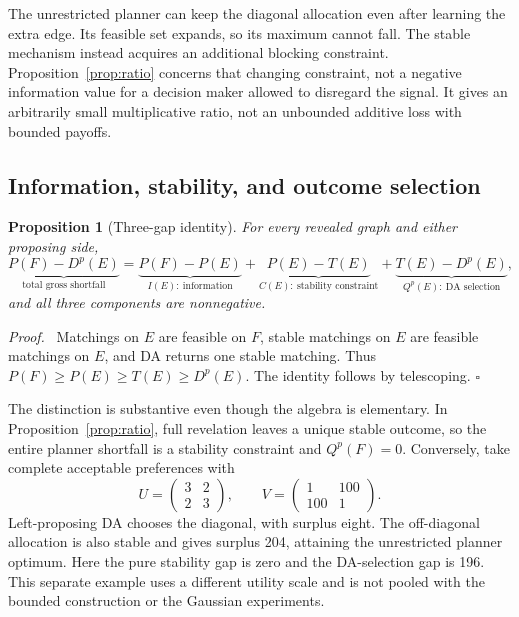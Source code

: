 \documentclass[11pt,a4paper]{article}
\newtheorem{proposition}{Proposition}
\newenvironment{proof}{\par\noindent\textit{Proof.}\ }{\hfill$\square$\par}
\begin{document}
The unrestricted planner can keep the diagonal allocation even after learning the extra edge. Its feasible set expands, so its maximum cannot fall. The stable mechanism instead acquires an additional blocking constraint. Proposition~\ref{prop:ratio} concerns that changing constraint, not a negative information value for a decision maker allowed to disregard the signal. It gives an arbitrarily small multiplicative ratio, not an unbounded additive loss with bounded payoffs.

\subsection{Information, stability, and outcome selection}
\begin{proposition}[Three-gap identity]\label{prop:gaps}
For every revealed graph and either proposing side,
\begin{equation}\label{eq:threegap}
\underbrace{P(F)-D^p(E)}_{\text{total gross shortfall}}
=\underbrace{P(F)-P(E)}_{I(E):\ \text{information}}
+\underbrace{P(E)-T(E)}_{C(E):\ \text{stability constraint}}
+\underbrace{T(E)-D^p(E)}_{Q^p(E):\ \text{DA selection}},
\end{equation}
and all three components are nonnegative.
\end{proposition}
\begin{proof}
Matchings on $E$ are feasible on $F$, stable matchings on $E$ are feasible matchings on $E$, and DA returns one stable matching. Thus $P(F)\ge P(E)\ge T(E)\ge D^p(E)$. The identity follows by telescoping.
\end{proof}

The distinction is substantive even though the algebra is elementary. In Proposition~\ref{prop:ratio}, full revelation leaves a unique stable outcome, so the entire planner shortfall is a stability constraint and $Q^p(F)=0$. Conversely, take complete acceptable preferences with
\begin{equation}\label{eq:selection}
U=\begin{pmatrix}3&2\\2&3\end{pmatrix},\qquad
V=\begin{pmatrix}1&100\\100&1\end{pmatrix}.
\end{equation}
Left-proposing DA chooses the diagonal, with surplus eight. The off-diagonal allocation is also stable and gives surplus 204, attaining the unrestricted planner optimum. Here the pure stability gap is zero and the DA-selection gap is 196. This separate example uses a different utility scale and is not pooled with the bounded construction or the Gaussian experiments.
\end{document}

